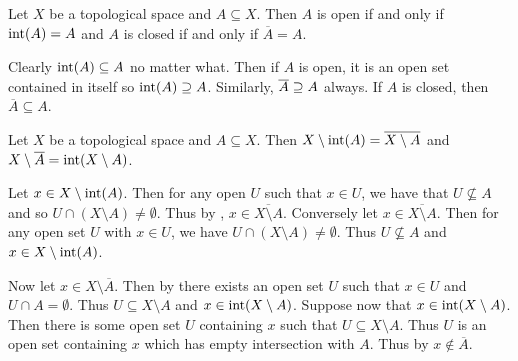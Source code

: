 \documentclass[letterpaper, 11pt, oneside]{book}
\begin{document}
\begin{prop}
  Let $X$ be a topological space and $A \subseteq X$.
  Then $A$ is open if and only if $\operatorname{int}(A) = A$ and $A$ is closed if and only if $\overline{A} = A$.
\end{prop}
\begin{pf}
  Clearly $\operatorname{int}(A) \subseteq A$ no matter what.
  Then if $A$ is open, it is an open set contained in itself so $\operatorname{int}(A) \supseteq A$.
  Similarly, $\overline{A} \supseteq A$ always.
  If $A$ is closed, then $\overline{A} \subseteq A$.
\end{pf}

\begin{prop}
  Let $X$ be a topological space and $A \subseteq X$.
  Then $X \setminus \operatorname{int}(A) = \overline{X \setminus A}$ and $X \setminus \overline{A} = \operatorname{int}(X \setminus A)$.
\end{prop}
\begin{pf}
  Let $x \in X \setminus \operatorname{int}(A)$.
  Then for any open $U$ such that $x \in U$, we have that $U \not\subseteq A$ and so $U \cap (X \setminus A) \neq \emptyset$.
  Thus by , $x \in \overline{X \setminus A}$.
  Conversely let $x \in \overline{X \setminus A}$.
  Then for any open set $U$ with $x \in U$, we have $U \cap (X \setminus A) \neq \emptyset$.
  Thus $U \not\subseteq A$ and $x \in X \setminus \operatorname{int}(A)$.

  Now let $x \in X \setminus \overline{A}$.
  Then by  there exists an open set $U$ such that $x \in U$ and $U \cap A = \emptyset$.
  Thus $U \subseteq X \setminus A$ and $x \in \operatorname{int}(X \setminus A)$.
  Suppose now that $x \in \operatorname{int}(X \setminus A)$.
  Then there is some open set $U$ containing $x$ such that $U \subseteq X \setminus A$.
  Thus $U$ is an open set containing $x$ which has empty intersection with $A$.
  Thus by  $x \notin \overline{A}$.
\end{pf}

\clearpage
\end{document}
